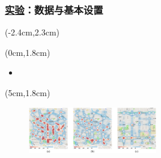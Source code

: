\begin{frame}
\frametitle{\englishfont \underline{实验}：数据与基本设置}
\newBackground

\begin{center}
	\begin{textblock*}{\textwidth}(-2.4cm,2.3cm)
	\begin{table}[h] \englishfont
{}
\end{table}
\end{textblock*}
\end{center}

\begin{center}
\begin{textblock*}{\textwidth}(0cm,1.8cm)
\begin{itemize} \englishfont \small
	\item[\ding{111}] {\color{cqublue}{实验与模型参数}}
\end{itemize}
\end{textblock*}
\end{center}

\begin{center}
\begin{textblock*}{\textwidth}(5cm,1.8cm)
	\begin{figure}
	\includegraphics[width=0.5\textwidth]{fig/Fig2-5-heat-map.pdf}
	\end{figure}
\end{textblock*}
\end{center}


\end{frame}
